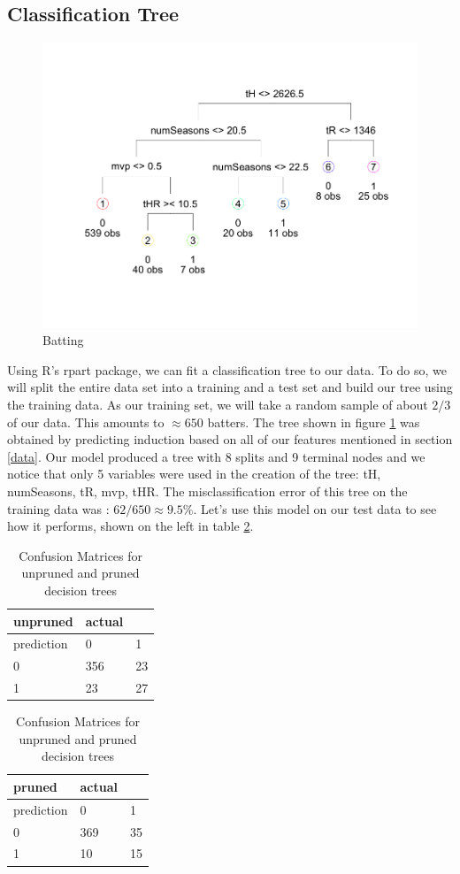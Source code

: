 \documentclass[preprint,12pt]{elsarticle}
\begin{document}
\subsection{Classification Tree}
\begin{figure}[h]
       \centering 
       \includegraphics[width=0.8\linewidth]{BatterUnpruned}
       \caption{Batting}
       \label{unprunedBat}
 \end{figure}
Using R's rpart package, we can fit a classification tree to our data. To do so, we will split the entire data set into a training and a test set and build our tree using the training data. As our training set, we will take a random sample of about $2/3$ of our data. This amounts to $\approx 650$ batters. The tree shown in figure \ref{unprunedBat} was obtained by predicting induction based on all of our features mentioned in section \ref{data}. Our model produced a tree with 8 splits and 9 terminal nodes and we notice that only 5 variables were used in the creation of the tree: tH, numSeasons, tR, mvp, tHR. The misclassification error of this tree on the training data was : $62/650 \approx 9.5\%$. Let's use this model on our test data to see how it performs, shown on the left in table \ref{conf}.

\begin{table}[h]
\centering
\begin{tabular}{|l |l l|}
\hline
 unpruned &  actual & \\
\hline
prediction & 0 & 1 \\
0 & 356 & 23 \\
1 & 23 & 27 \\
\hline
\end{tabular}
\quad
\begin{tabular}{|l |l l|}
\hline
 pruned &  actual & \\
\hline
prediction & 0 & 1 \\
0 & 369 & 35 \\
1 & 10 & 15 \\
\hline
\end{tabular}
\caption{Confusion Matrices for unpruned and pruned decision trees}
\label{conf}
\end{table}
\end{document}
